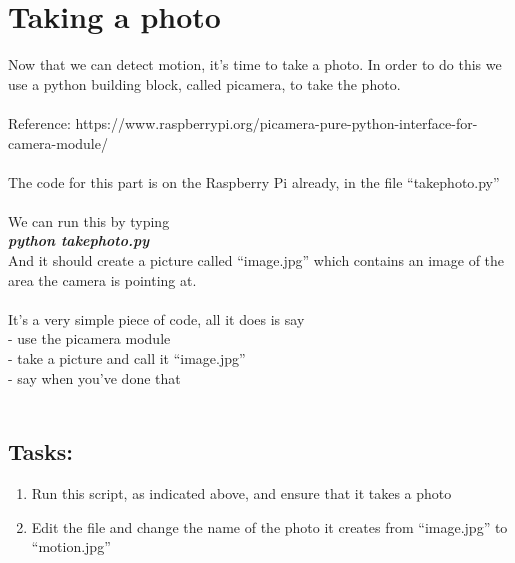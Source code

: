 \documentclass[a4paper]{article}
\begin{document}
\newpage\section {Taking a photo}
Now that we can detect motion, it's time to take a photo. In order to do this we use a python building block, called picamera, to take the photo.
\\
\\
Reference: https://www.raspberrypi.org/picamera-pure-python-interface-for-camera-module/
\\
\\
The code for this part is on the Raspberry Pi already, in the file ``takephoto.py''
\\
\\
We can run this by typing \\
\emph{\textbf{python takephoto.py}}
\\
And it should create a picture called ``image.jpg'' which contains an image of the area the camera is pointing at.
\\
\\
It's a very simple piece of code, all it does is say \\
- use the picamera module \\
- take a picture and call it ``image.jpg'' \\
- say when you've done that
\\
\\
\subsection{Tasks:}
\begin{enumerate}
\item Run this script, as indicated above, and ensure that it takes a photo
\item Edit the file and change the name of the photo it creates from ``image.jpg'' to ``motion.jpg''
\end {enumerate}
\end{document}
